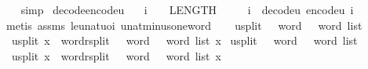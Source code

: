 \begin{isabellebody}
%
\isadelimproof
\ \ %
\endisadelimproof
%
\isatagproof
{}\isamarkupfalse%
\ simp%
\endisatagproof
{\isafoldproof}%
%
\isadelimproof
\isanewline
%
\endisadelimproof
\isanewline
{}\isamarkupfalse%
\ decode{\isacharunderscore}{\kern0pt}encode{\isacharunderscore}{\kern0pt}u{}{\isacharcolon}{\kern0pt}\isanewline
\ \ \ {\isachardoublequoteopen}i\ {\isasymle}\ {}\ {\isacharcircum}{\kern0pt}\ LENGTH{\isacharparenleft}{\kern0pt}{}{\isacharparenright}{\kern0pt}\ {\isacharminus}{\kern0pt}\ {}{\isachardoublequoteclose}\isanewline
\ \ \ {\isachardoublequoteopen}i\ {\isacharequal}{\kern0pt}\ decode{\isacharunderscore}{\kern0pt}u{}\ {\isacharparenleft}{\kern0pt}encode{\isacharunderscore}{\kern0pt}u{}\ i{\isacharparenright}{\kern0pt}{\isachardoublequoteclose}\isanewline
%
\isadelimproof
\ \ %
\endisadelimproof
%
\isatagproof
{}\isamarkupfalse%
\ {\isacharparenleft}{\kern0pt}metis\ assms\ le{\isacharunderscore}{\kern0pt}unat{\isacharunderscore}{\kern0pt}uoi\ unat{\isacharunderscore}{\kern0pt}minus{\isacharunderscore}{\kern0pt}one{\isacharunderscore}{\kern0pt}word{\isacharparenright}{\kern0pt}%
\endisatagproof
{\isafoldproof}%
%
\isadelimproof
\isanewline
%
\endisadelimproof
\ \ \isanewline
{}\isamarkupfalse%
\ u{}{}{\isacharunderscore}{\kern0pt}split\ {\isacharcolon}{\kern0pt}{\isacharcolon}{\kern0pt}\ {\isachardoublequoteopen}{}{}\ word\ {\isasymRightarrow}\ {}{}\ word\ list{\isachardoublequoteclose}\isanewline
\ \ \isanewline
\ \ {\isachardoublequoteopen}u{}{}{\isacharunderscore}{\kern0pt}split\ x\ {\isasymequiv}\ {\isacharparenleft}{\kern0pt}word{\isacharunderscore}{\kern0pt}rsplit\ {\isacharcolon}{\kern0pt}{\isacharcolon}{\kern0pt}\ {}{}\ word\ {\isasymRightarrow}\ {}{}\ word\ list{\isacharparenright}{\kern0pt}\ x{\isachardoublequoteclose}\isanewline
\isanewline
{}\isamarkupfalse%
\ u{}{}{\isacharunderscore}{\kern0pt}split\ {\isacharcolon}{\kern0pt}{\isacharcolon}{\kern0pt}\ {\isachardoublequoteopen}{}{}\ word\ {\isasymRightarrow}\ {}{}\ word\ list{\isachardoublequoteclose}\isanewline
\ \ \isanewline
\ \ {\isachardoublequoteopen}u{}{}{\isacharunderscore}{\kern0pt}split\ x\ {\isasymequiv}\ {\isacharparenleft}{\kern0pt}word{\isacharunderscore}{\kern0pt}rsplit\ {\isacharcolon}{\kern0pt}{\isacharcolon}{\kern0pt}\ {}{}\ word\ {\isasymRightarrow}\ {}{}\ word\ list{\isacharparenright}{\kern0pt}\ x{\isachardoublequoteclose}\isanewline

\end{isabellebody}
